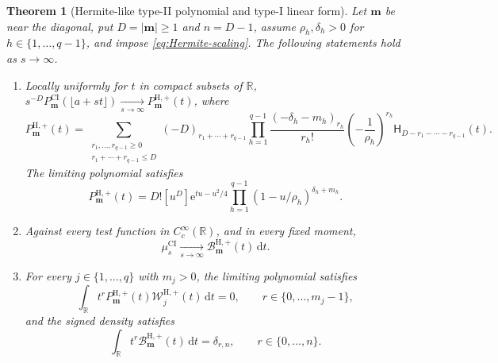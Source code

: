 \documentclass[10pt]{amsart}
\newcommand{\R}{\mathbb R}
\newcommand{\e}{\mathrm e}
\newcommand{\dd}{\,\mathrm d}
\newcommand{\mm}{\boldsymbol m}
\newcommand{\abs}[1]{\lvert#1\rvert}
\theoremstyle{plain}
\newtheorem{theorem}{Theorem}[section]
\theoremstyle{definition}
\theoremstyle{remark}
\begin{document}
\begin{theorem}[Hermite-like type-II polynomial and type-I linear form]
\label{thm:Hermite-limit}
Let \(\mm\) be near the diagonal, put \(D=\abs\mm\ge1\) and \(n=D-1\),
assume \(\rho_h,\delta_h>0\) for
\(h\in\{1,\ldots,q-1\}\), and impose
\eqref{eq:Hermite-scaling}. The following statements hold as
\(s\to\infty\).
\begin{enumerate}[label=\textnormal{(\roman*)}]
\item Locally uniformly for \(t\)
in compact subsets of \(\R\),
\(s^{-D}P_{\mm}^{\mathrm{CI}}(\lfloor a+st\rfloor)
\xrightarrow[s\to\infty]{}P_{\mm}^{\mathrm H,+}(t)\), where
\begin{equation}
 P_{\mm}^{\mathrm H,+}(t)
 =\sum_{\substack{r_1,\ldots,r_{q-1}\ge0\\
                    r_1+\cdots+r_{q-1}\le D}}
 (-D)_{r_1+\cdots+r_{q-1}}
 \prod_{h=1}^{q-1}
 \frac{(-\delta_h-m_h)_{r_h}}{r_h!}
 \left(-\frac1{\rho_h}\right)^{r_h}
 \mathsf H_{D-r_1-\cdots-r_{q-1}}(t).
 \label{eq:Hermite-A}
\end{equation}
The limiting polynomial satisfies
\begin{equation}
 P_{\mm}^{\mathrm H,+}(t)
 =D![u^D]\e^{tu-u^2/4}
 \prod_{h=1}^{q-1}(1-u/\rho_h)^{\delta_h+m_h}.
 \label{eq:Hermite-A-generating}
\end{equation}

\item Against every test function in \(C_c^\infty(\R)\), and in every fixed
moment,
\begin{equation}
 \mu_s^{\mathrm{CI}}\xrightarrow[s\to\infty]{}
 \mathcal B_{\mm}^{\mathrm H,+}(t)\dd t.
 \label{eq:Hermite-B}
\end{equation}

\item For every \(j\in\{1,\ldots,q\}\) with \(m_j>0\), the limiting
polynomial satisfies
\begin{equation}
 \int_{\mathbb R}t^rP_{\mm}^{\mathrm H,+}(t)
 \mathcal W_j^{\mathrm H,+}(t)\dd t=0,
 \qquad r\in\{0,\ldots,m_j-1\},
 \label{eq:Hermite-A-orthogonality}
\end{equation}
and the signed density satisfies
\begin{equation}
 \int_{\mathbb R}t^r\mathcal B_{\mm}^{\mathrm H,+}(t)\dd t
 =\delta_{r,n},\qquad r\in\{0,\ldots,n\}.
 \label{eq:Hermite-B-moments}
\end{equation}
\end{enumerate}
\end{theorem}
\end{document}
